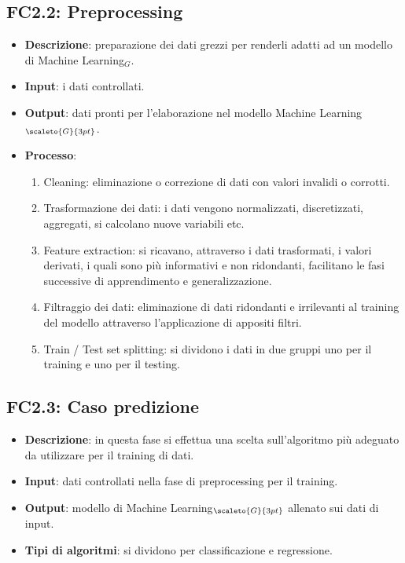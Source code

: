 \subsection{FC2.2: Preprocessing}\label{fasiProgettoElaborazioneDatiPreprocessing}

\begin{itemize}
	\item \textbf{Descrizione}: preparazione dei dati grezzi per renderli adatti ad un modello di Machine Learning$_G$.
	\item \textbf{Input}: i dati controllati.
	\item \textbf{Output}: dati pronti per l'elaborazione nel modello Machine Learning$_{\scaleto{G}{3pt}}$.
	\item \textbf{Processo}: \begin{enumerate}[leftmargin = 2cm]
		\item Cleaning: eliminazione o correzione di dati con valori invalidi o corrotti.
		\item Trasformazione dei dati: i dati vengono normalizzati, discretizzati, aggregati, si calcolano nuove variabili etc.
		\item Feature extraction: si ricavano, attraverso i dati trasformati, i valori derivati, i quali sono più informativi e non ridondanti, facilitano le fasi successive di apprendimento e generalizzazione.
		\item Filtraggio dei dati: eliminazione di dati ridondanti e irrilevanti al training del modello attraverso l'applicazione di appositi filtri.
		\item Train / Test set splitting: si dividono i dati in due gruppi uno per il training e uno per il testing.
	\end{enumerate}

\end{itemize}

\subsection{FC2.3: Caso predizione}\label{fasiProgettoElaborazioneDatiCasoPredizione}

\begin{itemize}
	\item \textbf{Descrizione}: in questa fase si effettua una scelta sull'algoritmo più adeguato da utilizzare per il training di dati.
	\item \textbf{Input}: dati controllati nella fase di preprocessing per il training.
	\item \textbf{Output}: modello di Machine Learning$_{\scaleto{G}{3pt}}$ allenato sui dati di input.
	\item \textbf{Tipi di algoritmi}: si dividono per classificazione e regressione.%
\end{itemize}

